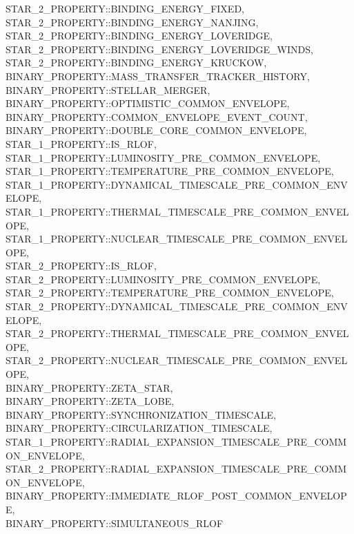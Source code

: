 \hfill
\begin{minipage}{\dimexpr\textwidth-2em} 
    STAR\_2\_PROPERTY::BINDING\_ENERGY\_FIXED, \\
    STAR\_2\_PROPERTY::BINDING\_ENERGY\_NANJING, \\
    STAR\_2\_PROPERTY::BINDING\_ENERGY\_LOVERIDGE, \\
    STAR\_2\_PROPERTY::BINDING\_ENERGY\_LOVERIDGE\_WINDS, \\
    STAR\_2\_PROPERTY::BINDING\_ENERGY\_KRUCKOW, \\
    BINARY\_PROPERTY::MASS\_TRANSFER\_TRACKER\_HISTORY, \\
    BINARY\_PROPERTY::STELLAR\_MERGER, \\
    BINARY\_PROPERTY::OPTIMISTIC\_COMMON\_ENVELOPE, \\
    BINARY\_PROPERTY::COMMON\_ENVELOPE\_EVENT\_COUNT, \\
    BINARY\_PROPERTY::DOUBLE\_CORE\_COMMON\_ENVELOPE, \\
    STAR\_1\_PROPERTY::IS\_RLOF, \\
    STAR\_1\_PROPERTY::LUMINOSITY\_PRE\_COMMON\_ENVELOPE, \\
    STAR\_1\_PROPERTY::TEMPERATURE\_PRE\_COMMON\_ENVELOPE, \\
    STAR\_1\_PROPERTY::DYNAMICAL\_TIMESCALE\_PRE\_COMMON\_ENVELOPE, \\
    STAR\_1\_PROPERTY::THERMAL\_TIMESCALE\_PRE\_COMMON\_ENVELOPE, \\
    STAR\_1\_PROPERTY::NUCLEAR\_TIMESCALE\_PRE\_COMMON\_ENVELOPE, \\
    STAR\_2\_PROPERTY::IS\_RLOF, \\
    STAR\_2\_PROPERTY::LUMINOSITY\_PRE\_COMMON\_ENVELOPE, \\
    STAR\_2\_PROPERTY::TEMPERATURE\_PRE\_COMMON\_ENVELOPE, \\
    STAR\_2\_PROPERTY::DYNAMICAL\_TIMESCALE\_PRE\_COMMON\_ENVELOPE, \\
    STAR\_2\_PROPERTY::THERMAL\_TIMESCALE\_PRE\_COMMON\_ENVELOPE, \\
    STAR\_2\_PROPERTY::NUCLEAR\_TIMESCALE\_PRE\_COMMON\_ENVELOPE, \\
    BINARY\_PROPERTY::ZETA\_STAR, \\
    BINARY\_PROPERTY::ZETA\_LOBE, \\
    BINARY\_PROPERTY::SYNCHRONIZATION\_TIMESCALE, \\
    BINARY\_PROPERTY::CIRCULARIZATION\_TIMESCALE, \\
    STAR\_1\_PROPERTY::RADIAL\_EXPANSION\_TIMESCALE\_PRE\_COMMON\_ENVELOPE, \\
    STAR\_2\_PROPERTY::RADIAL\_EXPANSION\_TIMESCALE\_PRE\_COMMON\_ENVELOPE, \\
    BINARY\_PROPERTY::IMMEDIATE\_RLOF\_POST\_COMMON\_ENVELOPE, \\
    BINARY\_PROPERTY::SIMULTANEOUS\_RLOF
\end{minipage}
\par\rcb{;}

